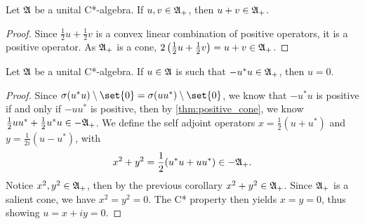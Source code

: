 \begin{corollary}
    Let \(\mathfrak{A}\) be a unital C*-algebra. If \(u,v\in \mathfrak{A}_+\), then \(u + v \in \mathfrak{A}_+\).
\end{corollary}
\begin{proof}
    Since \(\frac12 u + \frac12 v\) is a convex linear combination of positive operators, it is a positive operator. As \(\mathfrak{A}_+\) is a cone, \(2 \left(\frac12 u + \frac12 v\right) = u + v \in \mathfrak{A}_+\).
\end{proof}
\begin{corollary}
    Let \(\mathfrak{A}\) be a unital C*-algebra. If \(u \in \mathfrak{A}\) is such that \(-u^*u \in \mathfrak{A}_+\), then \(u = 0\).
\end{corollary}
\begin{proof}
    Since \(\sigma(u^*u) \setminus\set{0} = \sigma(uu^*)\setminus\set{0}\), we know that \(-u^*u\) is positive if and only if \(-uu^*\) is positive, then by \cref{thm:positive_cone}, we know \(\frac12 uu^* + \frac12 u^*u \in -\mathfrak{A}_+\). We define the self adjoint operators \(x = \frac12 (u + u^*)\) and \(y = \frac1{2i}(u - u^*)\), with
    \begin{equation*}
        x^2 + y^2 = \frac12(u^*u + uu^*) \in -\mathfrak{A}_+.
    \end{equation*}
    Notice \(x^2, y^2 \in \mathfrak{A}_+\), then by the previous corollary \(x^2 + y^2 \in \mathfrak{A}_+\). Since \(\mathfrak{A}_+\) is a salient cone, we have \(x^2 = y^2 = 0\). The C* property then yields \(x = y = 0\), thus showing \(u = x + iy = 0\).
\end{proof}

